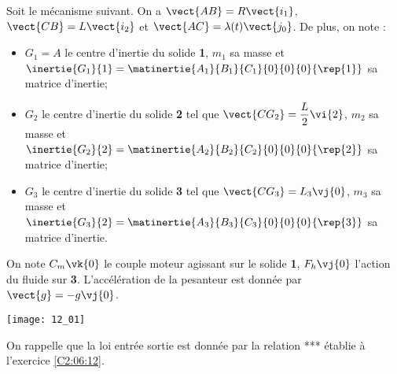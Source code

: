 \normaltrue \difficilefalse \tdifficilefalse
\correctionfalse


\setcounter{question}{0}%
\ifcorrection
\else
{}
\fi

\ifprof
\else
Soit le mécanisme suivant. On a $\vect{AB}=R\vect{i_1}$, $\vect{CB}=L\vect{i_2}$ et $\vect{AC}=\lambda(t) \vect{j_0}$. 
De plus, on note :
\begin{itemize}
\item $G_1 = A$ le centre d'inertie du solide \textbf{1}, $m_1$ sa masse et $\inertie{G_1}{1}=\matinertie{A_1}{B_1}{C_1}{0}{0}{0}{\rep{1}}$ sa matrice d'inertie;
\item $G_2$ le centre d'inertie du solide \textbf{2} tel que $\vect{CG_2}=\dfrac{L}{2} \vi{2}$, $m_2$ sa masse et $\inertie{G_2}{2}=\matinertie{A_2}{B_2}{C_2}{0}{0}{0}{\rep{2}}$ sa matrice d'inertie;
\item $G_3$ le centre d'inertie du solide \textbf{3} tel que $\vect{CG_3}=L_3 \vj{0}$, $m_3$ sa masse et $\inertie{G_3}{2}=\matinertie{A_3}{B_3}{C_3}{0}{0}{0}{\rep{3}}$ sa matrice d'inertie.
\end{itemize}
On note $C_m\vk{0}$ le couple moteur agissant sur le solide \textbf{1}, $F_h\vj{0}$ l'action du fluide sur \textbf{3}. L'accélération de la pesanteur est donnée par $\vect{g}=-g\vj{0}$.

\begin{marginfigure}
\texttt{[image: 12\_01]}
\end{marginfigure}
\fi

On rappelle que la loi entrée sortie est donnée par la relation *** établie à l'exercice \ref{C2:06:12}.

\ifprof
\else
\fi

\ifprof
\else
\fi

\ifprof
\else
\fi

\ifprof
\else
\fi

\ifprof
\else
\fi



\ifprof
\else


\fi